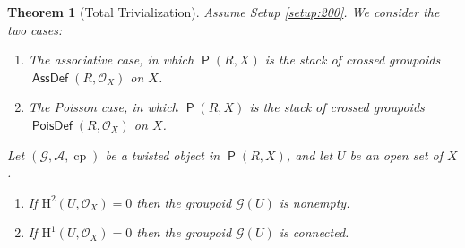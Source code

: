 \documentclass[a4paper, 10pt]{amsart}
\newtheorem{thm}[equation]{Theorem}
\theoremstyle{definition}
\numberwithin{equation}{section}
\newcommand{\opn}{\operatorname}
\newcommand{\cat}[1]{\operatorname{\mathsf{#1}}}
\newcommand{\mcal}[1]{\mathcal{#1}}
\newcommand{\mrm}[1]{\mathrm{#1}}
\newcommand{\tup}[1]{\textup{#1}}
\newcommand{\bsym}[1]{\boldsymbol{#1}}
\newcommand{\gerbe}[1]{\bsym{\mcal{#1}}}
\newcommand{\twocat}[1]{\operatorname{\bsym{\cat{#1}}}}
\newcommand{\lb}{\linebreak}
\begin{document}
\begin{thm}[Total Trivialization] \label{thm:6}
Assume Setup \tup{\ref{setup:200}}. We consider the two cases\tup{:}
\begin{enumerate}
\item[$\vartriangleright$] The associative case, in which 
$\twocat{P}(R, X)$ is the stack  of crossed groupoids 
$\twocat{AssDef}(R, \mcal{O}_X)$ on $X$.
%
\item[$\vartriangleright$] The Poisson case, in which 
$\twocat{P}(R, X)$ is the stack  of crossed groupoids \lb
$\twocat{PoisDef}(R, \mcal{O}_X)$ on $X$. 
\end{enumerate}
Let 
$(\gerbe{G}, \gerbe{A}, \opn{cp})$ be a twisted object in 
$\twocat{P}(R, X)$, and let $U$ be an open set of $X$.
\begin{enumerate}
\item If $\mrm{H}^2(U, \mcal{O}_X) = 0$ then the groupoid
$\gerbe{G}(U)$ is nonempty.
\item If $\mrm{H}^1(U, \mcal{O}_X) = 0$ then the groupoid
$\gerbe{G}(U)$ is connected.
\end{enumerate}
\end{thm}
\end{document}
